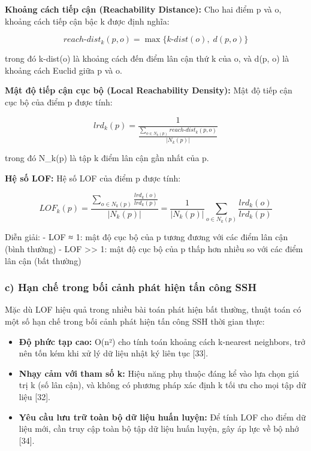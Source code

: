 \documentclass[
  a4paper]{report}
\providecommand{\tightlist}{%
  \setlength{\itemsep}{0pt}\setlength{\parskip}{0pt}}
\begin{document}
\textbf{Khoảng cách tiếp cận (Reachability Distance):} Cho hai điểm p và
o, khoảng cách tiếp cận bậc k được định nghĩa:

\[reach\text{-}dist_k(p, o) = \max\{k\text{-}dist(o), \; d(p, o)\}\]

trong đó k-dist(o) là khoảng cách đến điểm lân cận thứ k của o, và d(p,
o) là khoảng cách Euclid giữa p và o.

\textbf{Mật độ tiếp cận cục bộ (Local Reachability Density):} Mật độ
tiếp cận cục bộ của điểm p được tính:

\[lrd_k(p) = \frac{1}{\frac{\sum_{o \in N_k(p)} reach\text{-}dist_k(p, o)}{|N_k(p)|}}\]

trong đó N\_k(p) là tập k điểm lân cận gần nhất của p.

\textbf{Hệ số LOF:} Hệ số LOF của điểm p được tính:

\[LOF_k(p) = \frac{\sum_{o \in N_k(p)} \frac{lrd_k(o)}{lrd_k(p)}}{|N_k(p)|} = \frac{1}{|N_k(p)|} \sum_{o \in N_k(p)} \frac{lrd_k(o)}{lrd_k(p)}\]

Diễn giải: - LOF ≈ 1: mật độ cục bộ của p tương đương với các điểm lân
cận (bình thường) - LOF \textgreater\textgreater{} 1: mật độ cục bộ của
p thấp hơn nhiều so với các điểm lân cận (bất thường)

\subsubsection{c) Hạn chế trong bối cảnh phát hiện tấn công
SSH}\label{c-hux1ea1n-chux1ebf-trong-bux1ed1i-cux1ea3nh-phuxe1t-hiux1ec7n-tux1ea5n-cuxf4ng-ssh}

Mặc dù LOF hiệu quả trong nhiều bài toán phát hiện bất thường, thuật
toán có một số hạn chế trong bối cảnh phát hiện tấn công SSH thời gian
thực:

\begin{itemize}
\tightlist
\item
  \textbf{Độ phức tạp cao:} O(n²) cho tính toán khoảng cách k-nearest
  neighbors, trở nên tốn kém khi xử lý dữ liệu nhật ký liên tục
  {[}33{]}.
\item
  \textbf{Nhạy cảm với tham số k:} Hiệu năng phụ thuộc đáng kể vào lựa
  chọn giá trị k (số lân cận), và không có phương pháp xác định k tối ưu
  cho mọi tập dữ liệu {[}32{]}.
\item
  \textbf{Yêu cầu lưu trữ toàn bộ dữ liệu huấn luyện:} Để tính LOF cho
  điểm dữ liệu mới, cần truy cập toàn bộ tập dữ liệu huấn luyện, gây áp
  lực về bộ nhớ {[}34{]}.
\end{itemize}
\end{document}
